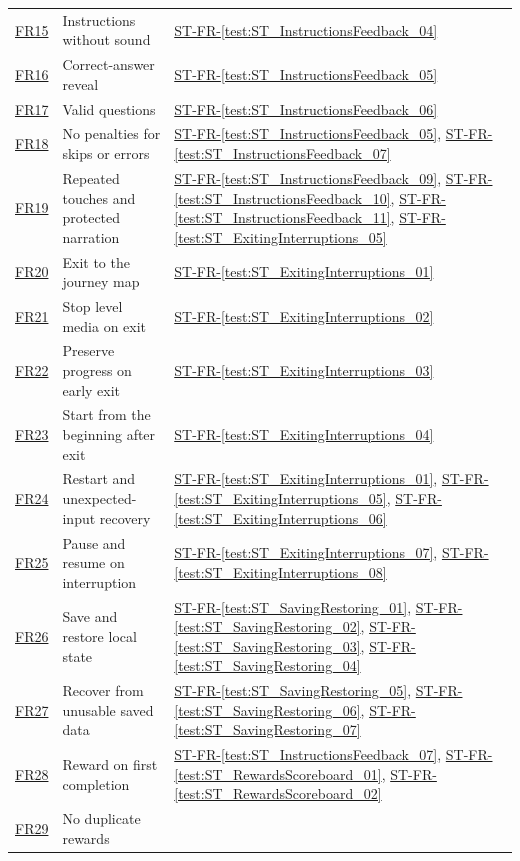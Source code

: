 \documentclass[10pt,titlepage]{article}
\newcommand{\frtestref}[1]{%
    \hyperref[test:#1]{ST-FR-\ref*{test:#1}}}
\newcommand{\srsurl}{https://team-hindsight.github.io/ophthamology-game/SRS/SRS.pdf}
\newcommand{\srsfrref}[2]{\href{\srsurl\#nameddest=#1}{FR#2}}
\begin{document}
\begin{longtable}{@{}>{\raggedright\arraybackslash}p{}
  >{\raggedright\arraybackslash}p{}
  >{\raggedright\arraybackslash}p{}@{}}
\srsfrref{FR_NarrationFallback}{15} & Instructions without sound &
  \frtestref{ST_InstructionsFeedback_04}\\
\srsfrref{FR_RevealAnswer}{16} & Correct-answer reveal &
  \frtestref{ST_InstructionsFeedback_05}\\
\srsfrref{FR_ValidQuestions}{17} & Valid questions &
  \frtestref{ST_InstructionsFeedback_06}\\
\srsfrref{FR_NoPenalty}{18} & No penalties for skips or errors &
  \frtestref{ST_InstructionsFeedback_05}, \frtestref{ST_InstructionsFeedback_07}\\
\srsfrref{FR_IgnoreRepeatedTouches}{19} & Repeated touches and protected narration &
  \frtestref{ST_InstructionsFeedback_09}, \frtestref{ST_InstructionsFeedback_10}, \frtestref{ST_InstructionsFeedback_11}, \frtestref{ST_ExitingInterruptions_05}\\
\srsfrref{FR_ExitLevel}{20} & Exit to the journey map &
  \frtestref{ST_ExitingInterruptions_01}\\
\srsfrref{FR_StopOnExit}{21} & Stop level media on exit &
  \frtestref{ST_ExitingInterruptions_02}\\
\srsfrref{FR_ExitKeepsData}{22} & Preserve progress on early exit &
  \frtestref{ST_ExitingInterruptions_03}\\
\srsfrref{FR_RestartAfterExit}{23} & Start from the beginning after exit &
  \frtestref{ST_ExitingInterruptions_04}\\
\srsfrref{FR_RestartLevel}{24} & Restart and unexpected-input recovery &
  \frtestref{ST_ExitingInterruptions_01}, \frtestref{ST_ExitingInterruptions_05}, \frtestref{ST_ExitingInterruptions_06}\\
\srsfrref{FR_Suspend}{25} & Pause and resume on interruption &
  \frtestref{ST_ExitingInterruptions_07}, \frtestref{ST_ExitingInterruptions_08}\\
\srsfrref{FR_PersistState}{26} & Save and restore local state &
  \frtestref{ST_SavingRestoring_01}, \frtestref{ST_SavingRestoring_02}, \frtestref{ST_SavingRestoring_03}, \frtestref{ST_SavingRestoring_04}\\
\srsfrref{FR_CorruptData}{27} & Recover from unusable saved data &
  \frtestref{ST_SavingRestoring_05}, \frtestref{ST_SavingRestoring_06}, \frtestref{ST_SavingRestoring_07}\\
\srsfrref{FR_FirstReward}{28} & Reward on first completion &
  \frtestref{ST_InstructionsFeedback_07}, \frtestref{ST_RewardsScoreboard_01}, \frtestref{ST_RewardsScoreboard_02}\\
\srsfrref{FR_NoDuplicateReward}{29} & No duplicate rewards &

\end{longtable}
\end{document}
